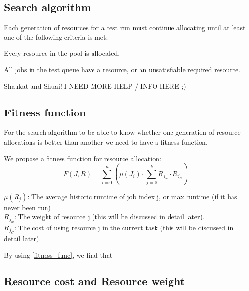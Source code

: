 \documentclass[twoside]{article}
\begin{document}
\begin{multicols}{2}
\section{Search algorithm}

Each generation of resources for a test run must continue allocating until at
least one of the following criteria is met:

\begin{compactitem}
\item Every resource in the pool is allocated.
\item All jobs in the test queue have a resource, or an unsatisfiable required resource.
\end{compactitem}

Shaukat and Shuai! I NEED MORE HELP / INFO HERE ;)

\subsection{Fitness function}

For the search algorithm to be able to know whether one generation of resource
allocations is better than another we need to have a fitness function.

We propose a fitness function for resource allocation:
\begin{equation}\label{fitness_func}
F(J, R) = \sum_{i=0}^{n}{\left( \mu \left(J_{i}\right) \cdot \sum_{j=0}^{k}{R_{j_w} \cdot R_{j_C} } \right)}
\end{equation}

\noindent $\mu (R_j)$: The average historic runtime of job index j, or max runtime (if it has
never been run) \\
\noindent $R_{j_w}$: The weight of resource j (this will be discussed in detail later).\\
\noindent $R_{j_C}$: The cost of using resource j in the current task (this will be discussed in detail later).

By using \ref{fitness_func}, we find that

\subsection{Resource cost and Resource weight}



\end{multicols}
\end{document}
